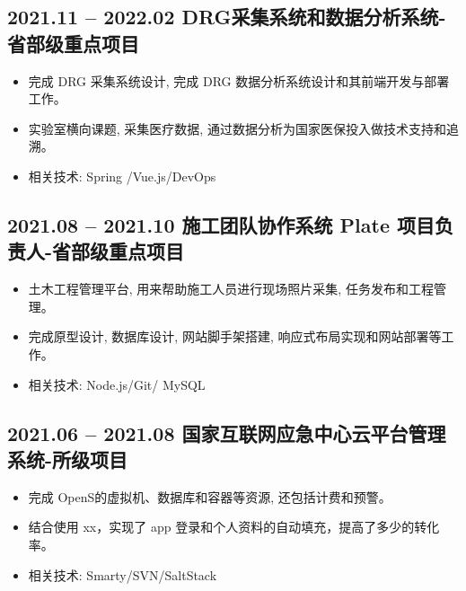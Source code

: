\documentclass{resume}
\begin{document}
\subsection{{2021.11 -- 2022.02} \hspace{2cm}\textbf{DRG采集系统和数据分析系统-省部级重点项目}}
    \begin{normalsize}
      \begin{itemize}
        \item 完成 DRG 采集系统设计, 完成 DRG 数据分析系统设计和其前端开发与部署工作。
        \item 实验室横向课题, 采集医疗数据, 通过数据分析为国家医保投入做技术支持和追溯。
        \item 相关技术: Spring /Vue.js/DevOps 
        \end{itemize}
    \end{normalsize}

\subsection{{2021.08 -- 2021.10} \hspace{2cm}\textbf{施工团队协作系统 Plate 项目负责人-省部级重点项目}}
    \begin{normalsize}
      \begin{itemize}
        \item 土木工程管理平台, 用来帮助施工人员进行现场照片采集, 任务发布和工程管理。
        \item 完成原型设计, 数据库设计, 网站脚手架搭建, 响应式布局实现和网站部署等工作。
        \item 相关技术: Node.js/Git/ MySQL  
        \end{itemize}
    \end{normalsize}

\subsection{{2021.06 -- 2021.08} \hspace{2cm}\textbf{国家互联网应急中心云平台管理系统-所级项目}}
    \begin{normalsize}
      \begin{itemize}
        \item 完成 OpenS的虚拟机、数据库和容器等资源, 还包括计费和预警。
        \item 结合使用 xx，实现了 app 登录和个人资料的自动填充，提高了多少的转化率。
        \item 相关技术: Smarty/SVN/SaltStack  
      \end{itemize}
    \end{normalsize}
\end{document}
